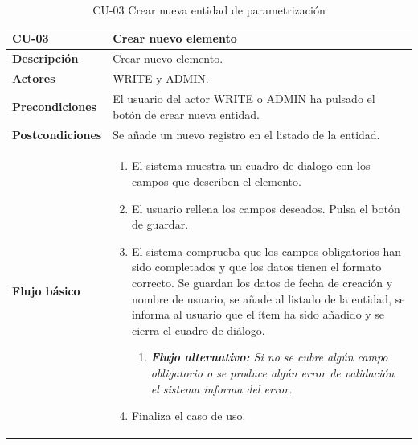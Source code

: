 \begin{table} [H]
    \centering
    \setlength{\leftmargini}{0.4cm}
	\resizebox{14cm}{!} { %
    \begin{tabular}{| m{3cm} | m{11cm} |}   
    \hline
	  \textbf{CU-03} & \textbf{Crear nuevo elemento} \\\hline
	  \textbf{Descripción} & Crear nuevo elemento. \\\hline
	  \textbf{Actores} & WRITE y ADMIN. \\\hline
	  \textbf{Precondiciones} & El usuario del actor WRITE o ADMIN ha pulsado el botón de crear nueva entidad. \\\hline
	  \textbf{Postcondiciones} & Se añade un nuevo registro en el listado de la entidad. \\\hline
	  \textbf{Flujo básico} & 
		\begin{enumerate}
	  	\item El sistema muestra un cuadro de dialogo con los campos que describen el elemento.
\item El usuario rellena los campos deseados. Pulsa el botón de guardar.
\item El sistema comprueba que los campos obligatorios han sido completados y que los datos tienen el formato correcto. Se guardan los datos de fecha de creación y nombre de usuario, se añade al listado de la entidad, se informa al usuario que el ítem ha sido añadido y se cierra el cuadro de diálogo.
			\begin{enumerate}	
			   \item \textit{\textbf{Flujo alternativo:} Si no se cubre algún campo obligatorio o se produce algún error de validación el sistema informa del error.}			   
			\end{enumerate}
\item Finaliza el caso de uso.
	  \end{enumerate} 	  	  
	  \\\hline
    \end{tabular}
    } %
    \caption{CU-03 Crear nueva entidad de parametrización}
    \label{tab:cu-nuevo-elemento}
\end{table}


